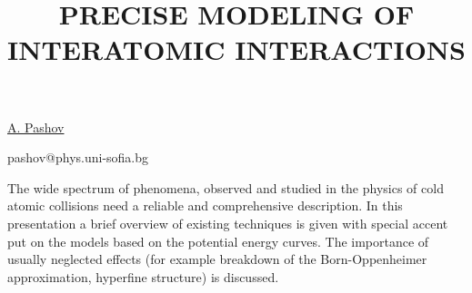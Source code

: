 \title{PRECISE MODELING OF INTERATOMIC INTERACTIONS}

\underline{A. Pashov} 

{\normalsize{\vspace{-4mm}
\unisofia

\email pashov@phys.uni-sofia.bg}}

The wide spectrum of phenomena, observed and studied in the physics of cold atomic collisions need a
reliable and comprehensive description. In this presentation a brief overview of existing techniques
is given with special accent put on the models based on the potential energy curves. The importance of
usually neglected effects (for example breakdown of the Born-Oppenheimer approximation, hyperfine
structure) is discussed.

\vspace{\baselineskip} 